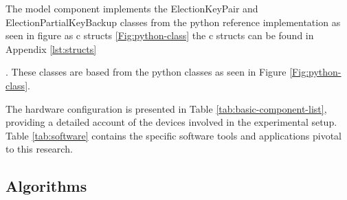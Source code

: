 The model component implements the ElectionKeyPair and ElectionPartialKeyBackup classes from the python reference implementation as seen in figure as c structs \ref{Fig:python-class} the c structs can be found in Appendix \ref{lst:structs} 

. These classes are based from the python classes as seen in Figure \ref{Fig:python-class}. 




The hardware configuration is presented in Table \ref{tab:basic-component-list}, providing a detailed account of the devices involved in the experimental setup. Table \ref{tab:software} contains the specific software tools and applications pivotal to this research.



\subsection{Algorithms}


